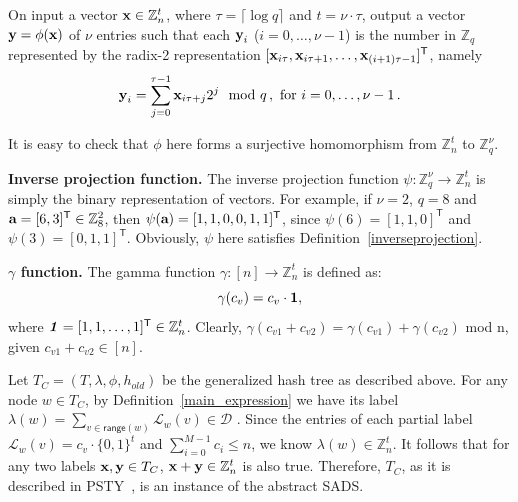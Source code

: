 On input a vector $\textbf{x}\in \mathbb{Z}_n^{t}$, where $\tau = \lceil \log q \rceil$ and $t=\nu \cdot \tau$, output a vector $\textbf{y} = \phi(\textbf{x})$ of $\nu$ entries such that each $\textbf{y}_i$ ($i=0,\ldots,\nu-1$) is the number in $\mathbb{Z}_q$ represented by the radix-2 representation $[\textbf{x}_{i\tau},\textbf{x}_{i\tau+1},\ldots,\textbf{x}_{(i+1)\tau-1}]^{\mathsf{T}}$, namely $$\textbf{y}_i=\sum_{j=0}^{\tau-1}\textbf{x}_{i\tau +j}2^j\mod q\,,\text{ for $i=0,\ldots,\nu-1$}\,.$$

It is easy to check that $\phi$ here forms a surjective homomorphism from $\mathbb{Z}_n^{t}$ to $\mathbb{Z}_q^\nu$. 

{\bf Inverse projection function.}
The inverse projection function $\psi: \mathbb{Z}_q^\nu \rightarrow \mathbb{Z}_n^{t}$ is simply the binary representation of vectors. For example, if $\nu=2$, $q=8$ and $\textbf{a}=[6,3]^{\mathsf{T}}\in \mathbb{Z}_8^2$, then $\psi (\textbf{a})=[1,1,0,0,1,1]^{\mathsf{T}}$, since $\psi(6)=[1,1,0]^{\mathsf{T}}$ and  $\psi(3)=[0,1,1]^{\mathsf{T}}$. Obviously, $\psi$ here satisfies Definition~\ref{inverseprojection}.

{\bf $\gamma$ function. }
The gamma function $\gamma: [n] \rightarrow \mathbb{Z}_n^{t}$ is defined as:
\begin{equation}\label{gamma1}
\gamma(c_{v}) = c_{v} \cdot {\bf 1}, 
\end{equation}
where $\textbf{\emph{1}}= [1, 1, \ldots, 1]^{\mathsf{T}} \in \mathbb{Z}_n^{t}$. Clearly, $\gamma(c_{v1}+c_{v2}) = \gamma(c_{v1}) + \gamma(c_{v2})$ mod n, given $c_{v1}+c_{v2} \in [n]$. 

Let $T_{C}= (T, \lambda, \phi, h_{old})$ be the generalized hash tree as described above. For any node $w \in T_{C}$, by Definition~\ref{main_expression} we have its label $\lambda(w) ={\sum_{v\in \mathsf{range}(w)}} \mathcal{L}_w(v) \in {\mathcal{D}}$ . Since the entries of each partial label $\mathcal{L}_w(v) = c_{v} \cdot \{0,1\}^{t}$ and $\sum_{i=0}^{M-1}c_i\le n$, we know $\lambda(w)\in \mathbb{Z}_{n}^t$. It follows that for any two labels ${\bf x, y} \in T_{C}$, ${\bf x+y}  \in \mathbb{Z}_{n}^t$ is also true. Therefore, $T_{C}$, as it is described in PSTY~\cite{DBLP:conf/eurocrypt/PapamanthouSTY13}, is an instance of the abstract SADS.

